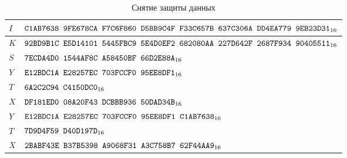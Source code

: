 \begin{table}[H]
\caption{Снятие защиты данных}\label{Table.TEST.AE.Unwrap}
\begin{tabular}{|l|l|}
\hline
$I$ & 
$\texttt{C1AB7638~9FE678CA~F7C6F860~D5BB9C4F~F33C657B~637C306A~DD4EA779~9EB23D31}_{16}$\\
\hline
$K$ & 
$\texttt{92BD9B1C~E5D14101~5445FBC9~5E4D0EF2~682080AA~227D642F~2687F934~90405511}_{16}$\\
\hline
$S$ & 
$\texttt{7ECDA4D0~1544AF8C~A58450BF~66D2E88A}_{16}$\\
\ddhline
$Y$ &
$\texttt{E12BDC1A~E28257EC~703FCCF0~95EE8DF1}_{16}$\\
\hline
$T$ & 
$\texttt{6A2C2C94~C4150DC0}_{16}$\\
\dhline
$X$ &
$\texttt{DF181ED0~08A20F43~DCBBB936~50DAD34B}_{16}$\\
\ddhline
$Y$ &
$\texttt{E12BDC1A~E28257EC~703FCCF0~95EE8DF1~C1AB7638}_{16}$\\
\hline
$T$ & 
$\texttt{7D9D4F59~D40D197D}_{16}$\\
\dhline
$X$ &
$\texttt{2BABF43E~B37B5398~A9068F31~A3C758B7~62F44AA9}_{16}$\\
\hline
\end{tabular}
\end{table}
